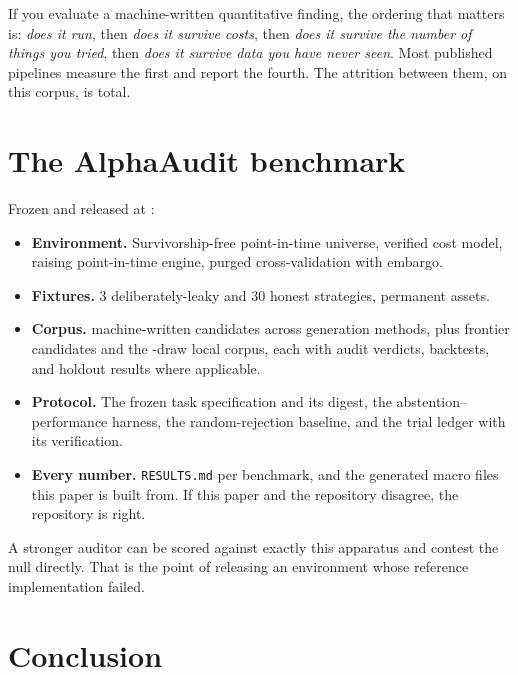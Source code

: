 \documentclass[11pt,a4paper]{article}
\begin{document}
If you evaluate a machine-written quantitative finding, the ordering that matters is: \emph{does
it run}, then \emph{does it survive costs}, then \emph{does it survive the number of things you
tried}, then \emph{does it survive data you have never seen}. Most published pipelines measure the
first and report the fourth. The attrition between them, on this corpus, is total.

\section{The AlphaAudit benchmark}
\label{sec:benchmark}

Frozen and released at \repo:

\begin{itemize}
\item \textbf{Environment.} Survivorship-free point-in-time universe, verified cost model,
  raising point-in-time engine, purged cross-validation with embargo.
\item \textbf{Fixtures.} 3 deliberately-leaky and 30 honest strategies, permanent assets.
\item \textbf{Corpus.} \pgmParadigmDraws{} machine-written candidates across
  \pgmParadigmArms{} generation methods, plus \aaGvTotal{} frontier candidates and the
  \aaLocalDraws{}-draw local corpus, each with audit verdicts, backtests, and holdout results
  where applicable.
\item \textbf{Protocol.} The frozen task specification and its digest, the abstention--performance
  harness, the random-rejection baseline, and the trial ledger with its verification.
\item \textbf{Every number.} \texttt{RESULTS.md} per benchmark, and the generated macro files this
  paper is built from. If this paper and the repository disagree, the repository is right.
\end{itemize}

A stronger auditor can be scored against exactly this apparatus and contest the null directly.
That is the point of releasing an environment whose reference implementation failed.

\section{Conclusion}
\end{document}
